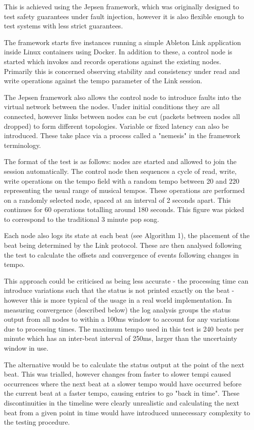 \documentclass[11pt]{article} %
\theoremstyle{plain}
\theoremstyle{definition}
\begin{document}
This is achieved using the Jepsen framework\cite{jepsen}, which was
originally designed to test safety guarantees under fault injection, however it
is also flexible enough to test systems with less strict guarantees.

The framework starts five instances running a simple Ableton Link application
inside Linux containers using Docker. In addition to these, a control node is
started which invokes and records operations against the existing nodes.
Primarily this is concerned observing stability and consistency under read and
write operations against the tempo parameter of the Link session.

The Jepsen framework also allows the control node to introduce faults into the
virtual network between the nodes. Under initial conditions they are all
connected, however links between nodes can be cut (packets between nodes all
dropped) to form different topologies. Variable or fixed latency can also be
introduced. These take place via a process called a "nemesis" in the framework
terminology.

The format of the test is as follows: nodes are started and allowed to join the
session automatically. The control node then sequences a cycle of read, write,
write operations on the tempo field with a random tempo between 20 and 220
representing the usual range of musical tempos. These operations are performed
on a randomly selected node, spaced at an interval of 2 seconds apart. This
continues for 60 operations totalling around 180 seconds. This figure was
picked to correspond to the traditional 3 minute pop song.

Each node also logs its state at each beat (see Algorithm 1), the placement of
the beat being determined by the Link protocol. These are then analysed
following the test to calculate the offsets and convergence of events following
changes in tempo.

This approach could be criticised as being less accurate - the processing time
can introduce variations such that the status is not printed exactly on the
beat - however this is more typical of the usage in a real world
implementation. In measuring convergence (described below) the log analysis
groups the status output from all nodes to within a 100ms window to account for
any variations due to processing times. The maximum tempo used in this test is
240 beats per minute which has an inter-beat interval of 250ms, larger than the
uncertainty window in use.

The alternative would be to calculate the status output at the point of the
next beat. This was trialled, however changes from faster to slower tempi
caused occurrences where the next beat at a slower tempo would have occurred
before the current beat at a faster tempo, causing entries to go "back in
time". These discontinuities in the timeline were clearly unrealistic and
calculating the next beat from a given point in time would have introduced
unnecessary complexity to the testing procedure.
\end{document}
